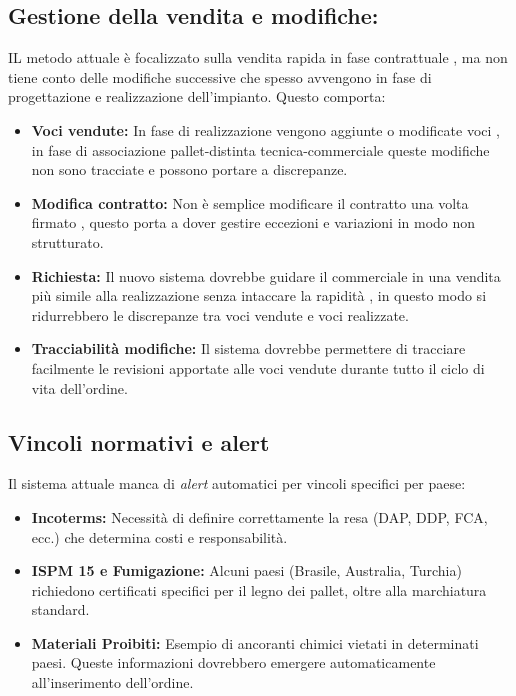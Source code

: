\documentclass[12pt, a4paper]{article} %
\begin{document}
\subsection{Gestione della vendita e modifiche:}
IL metodo attuale è focalizzato sulla vendita rapida  in fase contrattuale , ma non tiene conto delle modifiche successive che spesso avvengono in fase di progettazione e realizzazione dell'impianto. Questo comporta:
\begin{itemize}
    \item \textbf{Voci vendute:} In fase di realizzazione vengono aggiunte o modificate voci , in fase di associazione pallet-distinta tecnica-commerciale queste modifiche non sono tracciate e possono portare a discrepanze.
    \item \textbf{Modifica contratto:} Non è semplice modificare il contratto una volta firmato , questo porta a dover gestire eccezioni e variazioni in modo non strutturato.
    \item \textbf{Richiesta:} Il nuovo sistema dovrebbe guidare il commerciale in una vendita più simile alla realizzazione senza intaccare la rapidità , in questo modo si ridurrebbero le discrepanze tra voci vendute e voci realizzate.
    \item \textbf{Tracciabilità modifiche:} Il sistema dovrebbe permettere di tracciare facilmente le revisioni apportate alle voci vendute durante tutto il ciclo di vita dell'ordine.
\end{itemize}

\subsection{Vincoli normativi e alert}
Il sistema attuale manca di \textit{alert} automatici per vincoli specifici per
paese:
\begin{itemize}
    \item \textbf{Incoterms:} Necessità di definire correttamente la resa (DAP, DDP, FCA, ecc.) che determina costi e responsabilità.
    \item \textbf{ISPM 15 e Fumigazione:} Alcuni paesi (Brasile, Australia, Turchia) richiedono certificati specifici per il legno dei pallet, oltre alla marchiatura standard.
    \item \textbf{Materiali Proibiti:} Esempio di ancoranti chimici vietati in determinati paesi. Queste informazioni dovrebbero emergere automaticamente all'inserimento dell'ordine.
\end{itemize}
\end{document}
